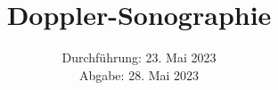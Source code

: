 

\subject{\texorpdfstring{\vspace{2ex}}{}US3\texorpdfstring{\vspace{-2ex}}{}} %
\title{Doppler-Sonographie} %
\date{
	Durchführung: 23. Mai 2023 %
	\\ Abgabe: 28. Mai 2023 %
}




\maketitle
\thispagestyle{empty}


\tableofcontents
\newpage







\printbibliography{}

\newpage



